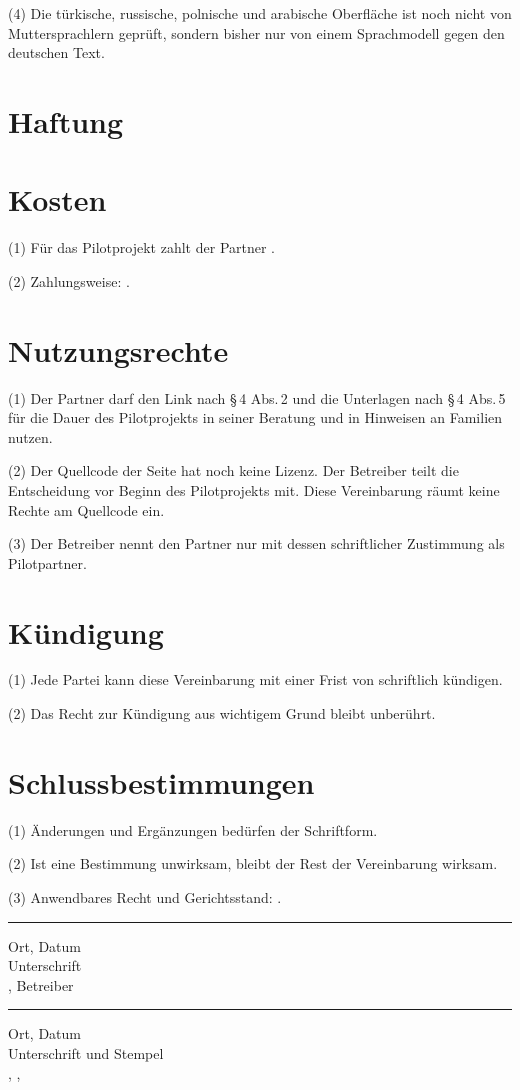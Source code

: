 \documentclass[fontsize=11pt,paper=a4,parskip=half]{scrartcl}
\newcommand{\sigfield}[1]{\parbox[t]{0.45\linewidth}{\vspace{14mm}\hrule\vspace{1mm}%
  \footnotesize #1}}
\begin{document}
(4) Die türkische, russische, polnische und arabische Oberfläche ist noch nicht von
Muttersprachlern geprüft, sondern bisher nur von einem Sprachmodell gegen den
deutschen Text.

\section{Haftung}

\section{Kosten}
(1) Für das Pilotprojekt zahlt der Partner .

(2) Zahlungsweise: .

\section{Nutzungsrechte}
(1) Der Partner darf den Link nach §\,4 Abs.\,2 und die Unterlagen nach §\,4 Abs.\,5
für die Dauer des Pilotprojekts in seiner Beratung und in Hinweisen an Familien
nutzen.

(2) Der Quellcode der Seite hat noch keine Lizenz. Der Betreiber teilt die
Entscheidung vor Beginn des Pilotprojekts mit. Diese Vereinbarung räumt keine
Rechte am Quellcode ein.

(3) Der Betreiber nennt den Partner nur mit dessen schriftlicher Zustimmung als
Pilotpartner.

\section{Kündigung}
(1) Jede Partei kann diese Vereinbarung mit einer Frist von 
schriftlich kündigen.

(2) Das Recht zur Kündigung aus wichtigem Grund bleibt unberührt.

\section{Schlussbestimmungen}
(1) Änderungen und Ergänzungen bedürfen der Schriftform.

(2) Ist eine Bestimmung unwirksam, bleibt der Rest der Vereinbarung wirksam.

(3) Anwendbares Recht und Gerichtsstand: .

\vspace{6mm}
\noindent\sigfield{Ort, Datum\\Unterschrift\\, Betreiber}\hfill
\sigfield{Ort, Datum\\Unterschrift und Stempel\\, \blank{Funktion},
\blank{Organisation}}
\end{document}
